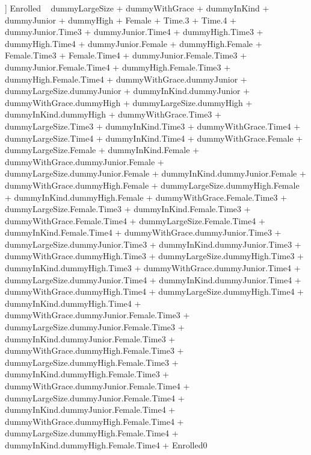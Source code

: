 \begin{Schunk}
\begin{Soutput}
[[5]]
Enrolled ~ dummyLargeSize + dummyWithGrace + dummyInKind + dummyJunior + 
    dummyHigh + Female + Time.3 + Time.4 + dummyJunior.Time3 + 
    dummyJunior.Time4 + dummyHigh.Time3 + dummyHigh.Time4 + dummyJunior.Female + 
    dummyHigh.Female + Female.Time3 + Female.Time4 + dummyJunior.Female.Time3 + 
    dummyJunior.Female.Time4 + dummyHigh.Female.Time3 + dummyHigh.Female.Time4 + 
    dummyWithGrace.dummyJunior + dummyLargeSize.dummyJunior + 
    dummyInKind.dummyJunior + dummyWithGrace.dummyHigh + dummyLargeSize.dummyHigh + 
    dummyInKind.dummyHigh + dummyWithGrace.Time3 + dummyLargeSize.Time3 + 
    dummyInKind.Time3 + dummyWithGrace.Time4 + dummyLargeSize.Time4 + 
    dummyInKind.Time4 + dummyWithGrace.Female + dummyLargeSize.Female + 
    dummyInKind.Female + dummyWithGrace.dummyJunior.Female + 
    dummyLargeSize.dummyJunior.Female + dummyInKind.dummyJunior.Female + 
    dummyWithGrace.dummyHigh.Female + dummyLargeSize.dummyHigh.Female + 
    dummyInKind.dummyHigh.Female + dummyWithGrace.Female.Time3 + 
    dummyLargeSize.Female.Time3 + dummyInKind.Female.Time3 + 
    dummyWithGrace.Female.Time4 + dummyLargeSize.Female.Time4 + 
    dummyInKind.Female.Time4 + dummyWithGrace.dummyJunior.Time3 + 
    dummyLargeSize.dummyJunior.Time3 + dummyInKind.dummyJunior.Time3 + 
    dummyWithGrace.dummyHigh.Time3 + dummyLargeSize.dummyHigh.Time3 + 
    dummyInKind.dummyHigh.Time3 + dummyWithGrace.dummyJunior.Time4 + 
    dummyLargeSize.dummyJunior.Time4 + dummyInKind.dummyJunior.Time4 + 
    dummyWithGrace.dummyHigh.Time4 + dummyLargeSize.dummyHigh.Time4 + 
    dummyInKind.dummyHigh.Time4 + dummyWithGrace.dummyJunior.Female.Time3 + 
    dummyLargeSize.dummyJunior.Female.Time3 + dummyInKind.dummyJunior.Female.Time3 + 
    dummyWithGrace.dummyHigh.Female.Time3 + dummyLargeSize.dummyHigh.Female.Time3 + 
    dummyInKind.dummyHigh.Female.Time3 + dummyWithGrace.dummyJunior.Female.Time4 + 
    dummyLargeSize.dummyJunior.Female.Time4 + dummyInKind.dummyJunior.Female.Time4 + 
    dummyWithGrace.dummyHigh.Female.Time4 + dummyLargeSize.dummyHigh.Female.Time4 + 
    dummyInKind.dummyHigh.Female.Time4 + Enrolled0


\end{Soutput}
\end{Schunk}
